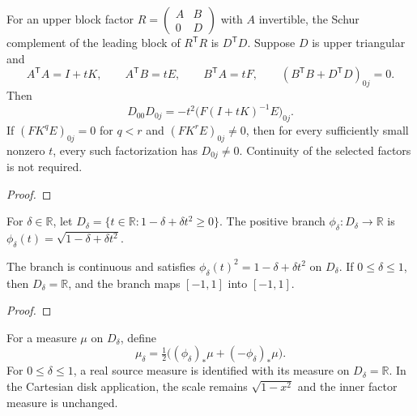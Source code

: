 \begin{supporting}
\begin{theorem}
\label{thm:cholesky-schur-path}
\leanok
For an upper block factor $R=\begin{pmatrix}A&B\\0&D\end{pmatrix}$ with $A$
invertible, the Schur complement of the leading block of $R^\mathsf{T}R$ is
$D^\mathsf{T}D$. Suppose $D$ is upper triangular and
\[
 A^\mathsf{T}A=I+tK,\qquad A^\mathsf{T}B=tE,\qquad B^\mathsf{T}A=tF,
 \qquad (B^\mathsf{T}B+D^\mathsf{T}D)_{0j}=0.
\]
Then
\[
 D_{00}D_{0j}=-t^2\bigl(F(I+tK)^{-1}E\bigr)_{0j}.
\]
If $(FK^qE)_{0j}=0$ for $q<r$ and $(FK^rE)_{0j}\ne0$, then for every
sufficiently small nonzero $t$, every such factorization has $D_{0j}\ne0$.
Continuity of the selected factors is not required.
\end{theorem}
\begin{proof}
\leanok
\end{proof}

\begin{definition}
\label{def:disk-deformation-branch}
\leanok
For $\delta\in\mathbb R$, let $D_\delta=\{t\in\mathbb R:1-\delta+\delta t^2\ge0\}$.
The positive branch $\phi_\delta:D_\delta\to\mathbb R$ is
$\phi_\delta(t)=\sqrt{1-\delta+\delta t^2}$.
\end{definition}

\begin{theorem}
\label{thm:disk-deformation-branch}
\leanok
The branch is continuous and satisfies $\phi_\delta(t)^2=1-\delta+\delta t^2$ on $D_\delta$.
If $0\le\delta\le1$, then $D_\delta=\mathbb R$, and the branch maps $[-1,1]$ into $[-1,1]$.
\end{theorem}
\begin{proof}
\leanok
\end{proof}

\begin{definition}
\label{def:disk-deformation}
\leanok
For a measure $\mu$ on $D_\delta$, define
\[
 \mu_\delta=\tfrac12\bigl((\phi_\delta)_*\mu+(-\phi_\delta)_*\mu\bigr).
\]
For $0\le\delta\le1$, a real source measure is identified with its measure on $D_\delta=\mathbb R$.
In the Cartesian disk application, the scale remains $\sqrt{1-x^2}$ and the inner factor measure is unchanged.
\end{definition}


\end{supporting}
